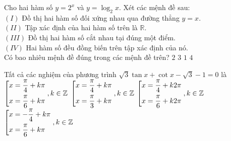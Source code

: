 \begin{ex}%
Cho hai hàm số $y=2^x$ và $y=\log_2x$. Xét các mệnh đề sau: \\
$(I)$ Đồ thị hai hàm số đối xứng nhau qua đường thẳng $y=x$. \\
$(II)$ Tập xác định của hai hàm số trên là $\mathbb{R}$. \\
$(III)$ Đồ thị hai hàm số cắt nhau tại đúng một điểm. \\
$(IV)$ Hai hàm số đều đồng biến trên tập xác định của nó. \\
Có bao nhiêu mệnh đề đúng trong các mệnh đề trên?
\choice
{\True $2$}
{$3$}
{$1$}
{$4$}
\end{ex}

\begin{ex}%
Tất cả các nghiệm của phương trình $\sqrt{3}\tan x + \cot x - \sqrt{3} - 1=0$ là
\choice
{\True $\left[\begin{aligned}& x=\dfrac{\pi}{4} + k\pi \\  & x=\dfrac{\pi}{6} + k\pi \end{aligned}\right., k\in \mathbb{Z}$}
{$\left[\begin{aligned}& x=\dfrac{\pi}{4} + k\pi \\  & x=\dfrac{\pi}{3} + k\pi\end{aligned}\right., k\in \mathbb{Z}$}
{$\left[\begin{aligned}& x=\dfrac{\pi}{4} + k2\pi \\  & x=\dfrac{\pi}{6} + k2\pi \end{aligned}\right., k\in \mathbb{Z}$}
{$\left[\begin{aligned}& x= - \dfrac{\pi}{4} + k\pi \\  & x=\dfrac{\pi}{6} + k\pi\end{aligned}\right., k\in \mathbb{Z}$}
\end{ex}


